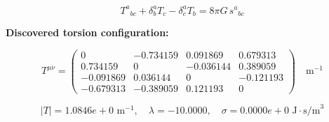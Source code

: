 
\begin{equation}
  T^a{}_{bc} + \delta^a_b T_c - \delta^a_c T_b = 8\pi G \, s^a{}_{bc}
\end{equation}

\textbf{Discovered torsion configuration:}

\begin{equation}
  T^{\mu\nu} = \begin{pmatrix}
    0 & -0.734159 & 0.091869 & 0.679313 \\
    0.734159 & 0 & -0.036144 & 0.389059 \\
    -0.091869 & 0.036144 & 0 & -0.121193 \\
    -0.679313 & -0.389059 & 0.121193 & 0
  \end{pmatrix} \quad \text{m}^{-1}
\end{equation}

\begin{equation}
  |T| = 1.0846e+0 \text{ m}^{-1}, \quad
  \lambda = -10.0000, \quad
  \sigma = 0.0000e+0 \text{ J}\cdot\text{s/m}^3
\end{equation}